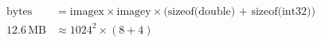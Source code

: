 \documentclass[preview, border=10pt]{standalone}
\begin{document}
\abovedisplayskip=-3pt
\begin{align*}
\text{bytes} &= \text{imagex} \times \text{imagey} \times \text{(sizeof(double) + sizeof(int32))} \\
12.6 \, \text{MB} &\approx 1024^2 \times (8+4)
\end{align*}
\end{document}

